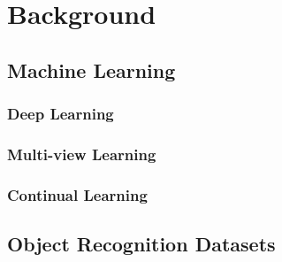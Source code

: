 
\chapter{Background}
\label{chap:background}

\section{Machine Learning}

\subsection{Deep Learning}

\subsection{Multi-view Learning}

\subsection{Continual Learning}

\section{Object Recognition Datasets}

